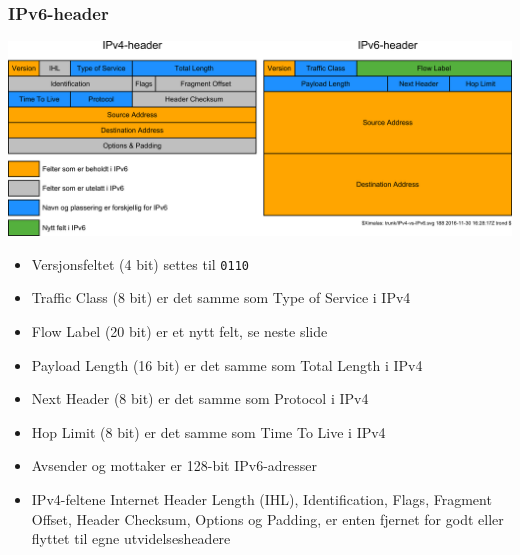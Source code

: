\begin{frame}%
  \frametitle{IPv6-header}
  \begin{multicols}{2}
      {\includegraphics[scale=.1225]{IPv4-vs-IPv6.pdf}}

    \begin{itemize}%
    \item Versjonsfeltet (4 bit) settes til \texttt{0110}
    \item Traffic Class (8 bit) er det samme som Type of Service i
      IPv4
    \item Flow Label (20 bit) er et nytt felt, se neste slide
    \item Payload Length (16 bit) er det samme som Total Length i IPv4
    \item Next Header (8 bit) er det samme som Protocol i IPv4
    \item Hop Limit (8 bit) er det samme som Time To Live i IPv4
    \item Avsender og mottaker er 128-bit IPv6-adresser
    \item IPv4-feltene Internet Header Length (IHL), Identification,
      Flags, Fragment Offset, Header Checksum, Options og Padding, er
      enten fjernet for godt eller flyttet til egne utvidelsesheadere
    \end{itemize}
  \end{multicols}
\end{frame}

